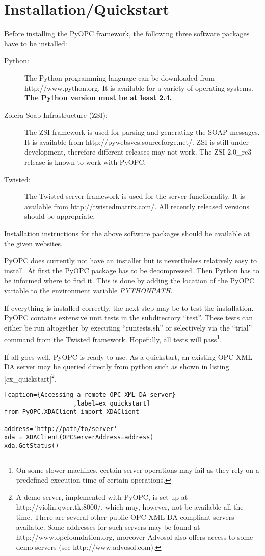 
\section {Installation/Quickstart}
\thispagestyle{plain}

Before installing the PyOPC framework, the following three software
packages have to be installed:

\begin{description}
\item[Python:] The Python programming language can be downloaded from
http://www.python.org. It is available for a variety of operating systems.
{\bf The Python version must be at least 2.4.}

\item[Zolera Soap Infrastructure (ZSI):] The ZSI framework is used for
parsing and generating the SOAP messages. It is available from
http://pywebsvcs.sourceforge.net/. ZSI is still under development, therefore
different releases may not work. The ZSI-2.0\_rc3 release is known to work
with PyOPC.

\item[Twisted:] The Twisted server framework is used for the server
functionality. It is available from http://twistedmatrix.com/. All
recently released versions should be appropriate.
\end{description}

Installation instructions for the above software packages should be
available at the given websites.

PyOPC does currently not have an installer but is nevertheless
relatively easy to install. At first the PyOPC package has to be
decompressed. Then Python has to be informed where to find it. This is
done by adding the location of the PyOPC variable to the environment
variable {\sl PYTHONPATH}.

If everything is installed correctly, the next step may be to test the
installation. PyOPC contains extensive unit tests in the subdirectory ``test''.
These tests can either be run altogether by executing ``runtests.sh'' or 
selectively via the ``trial'' command from the Twisted framework. Hopefully,
all tests will pass\footnote{On some slower machines, certain server operations
may fail as they rely on a predefined execution time of certain operations.}. 

If all goes well, PyOPC is ready to use. As a quickstart, an existing
OPC XML-DA server may be queried directly from python such as shown in
listing \ref{ex_quickstart}\footnote{A demo server, implemented with
PyOPC, is set up at http://violin.qwer.tk:8000/, which may, however,
not be available all the time. There are several other public OPC
XML-DA compliant servers available. Some addresses for such servers
may be found at http://www.opcfoundation.org, moreover Advosol also
offers access to some demo servers (see http://www.advosol.com).}.

\lstset{language=C}
\begin{lstlisting}[caption={Accessing a remote OPC XML-DA server}
                   ,label=ex_quickstart] 
from PyOPC.XDAClient import XDAClient

address='http://path/to/server'
xda = XDAClient(OPCServerAddress=address)
xda.GetStatus()
\end{lstlisting}

